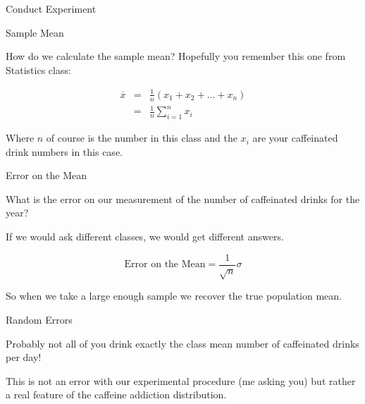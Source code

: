 \documentclass{beamer}
\begin{document}
\begin{frame}{Conduct Experiment}

\end{frame}

\begin{frame}{Sample Mean}

How do we calculate the sample mean?  Hopefully you remember this one from Statistics class:

\begin{eqnarray}
\overline{x} & = & \frac{1}{n}(x_{1}+x_{2}+\ldots+x_{n}) \\
 & = & \frac{1}{n}\sum^{n}_{i=1}x_{i}
\end{eqnarray}


\noindent Where $n$ of course is the number in this class and the $x_{i}$ are your caffeinated drink numbers in this case. 


\end{frame}

\begin{frame}{Error on the Mean}

What is the error on our measurement of the number of caffeinated drinks for the year?

\vspace{5mm}

If we would ask different classes, we would get different answers.

\vspace{5mm}

\[
\textrm{Error on the Mean} = \frac{1}{\sqrt{n}}\sigma
\]

So when we take a large enough sample we recover the true population mean.

\end{frame}





\begin{frame}{Random Errors}

Probably not all of you drink exactly the class mean number of caffeinated drinks per day!  

\vspace{5mm}

This is not an error with our experimental procedure (me asking you) but rather a real feature of the caffeine addiction distribution.  

\end{frame}
\end{document}

